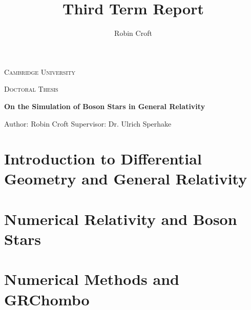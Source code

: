 \documentclass[11pt]{report}  %
\title{Third Term Report}
\author{Robin Croft}
\numberwithin{equation}{section}
\begin{document}
\begin{titlepage}
  \centering
  
  \centering
  {\scshape\LARGE Cambridge University \par}
  \vspace{1cm}
  {\scshape\Large Doctoral Thesis \par} 
    \vspace{2cm} 
    \hline
    \vspace{0.3cm}
  {\Large\itshape \par}
  {\huge\bfseries On the Simulation of Boson Stars in General Relativity\par} \vspace{0.3cm}
  \hline
  \vfill
   Author: Robin Croft
\vfill
  Supervisor: Dr. Ulrich Sperhake
  \vfill

    \begin{figure}[h!]
  \centering
\end{figure}


\end{titlepage}						%
\tableofcontents
\newpage
{}





\chapter{Introduction to Differential Geometry and General Relativity}












\chapter{Numerical Relativity and Boson Stars}






\chapter{Numerical Methods and GRChombo}
\end{document}
